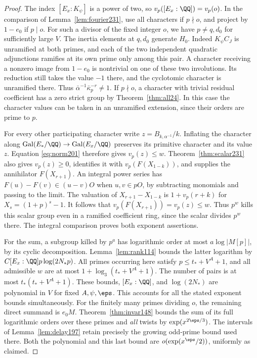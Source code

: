 \documentclass[a4paper,11pt]{article}
\theoremstyle{definition}
\theoremstyle{remark}
\numberwithin{equation}{section}
\begin{document}
\begin{proof}
The index \([E_x:K_\psi]\) is a power of two, so \(v_p([E_x:\QQ])=
v_p(o)\). In the comparison of Lemma~\ref{lem:fourier231},
use all characters if \(p\nmid o\), and project by \(1-e_0\)
if \(p\mid o\). For such a divisor of the fixed integer \(o\),
we have \(p\ne q,d_0\) for sufficiently large \(V\).
The inertia elements at \(q,d_0\) generate \(H_0\).
Indeed \(K_\psi C_J\) is unramified at both primes, and each
of the two independent quadratic adjunctions ramifies at its
own prime only among this pair. A character receiving a nonzero
image from \(1-e_0\) is nontrivial on one of these two involutions.
Its reduction still takes the value \(-1\) there, and the
cyclotomic character is unramified there. Thus
\(\bar\alpha^{-1}\bar\kappa_p^{-r}\ne1\).
If \(p\nmid o\), a character with trivial residual coefficient
has a zero strict group by Theorem~\ref{thm:all24}.
In this case the character values can be taken in an unramified
extension, since their orders are prime to \(p\).

For every other participating character write \(z=B_{k,\alpha^{-1}}/k\).
Inflating the character along \(\operatorname{Gal}(E_*/\QQ)\to
\operatorname{Gal}(E_x/\QQ)\) preserves its primitive character
and its value \(z\). Equation \eqref{eq:norm201} therefore gives
\(v_p(z)\le w\). Theorem~\ref{thm:scalar231}
also gives \(v_p(z)\ge0\), identifies it with \(v_p(F(X_{1-k}))\),
and supplies the annihilator \(F(X_{r+1})\).
An integral power series has
\(F(u)-F(v)\in(u-v)O\) when \(u,v\in pO\), by subtracting
monomials and passing to the limit. The valuation of
\(X_{r+1}-X_{1-k}\) is \(1+v_p(r+k)\) for \(X_s=(1+p)^s-1\).
It follows that \(v_p(F(X_{r+1}))=v_p(z)\le w\).
Thus \(p^w\) kills this scalar group even in a ramified coefficient
ring, since the scalar divides \(p^w\) there. The integral
comparison proves both exponent assertions.

For the sum, a subgroup killed by \(p^a\) has logarithmic order
at most \(a\log|M[p]|\), by its cyclic decomposition.
Lemma~\ref{lem:rank114} bounds the latter logarithm by
\(C[E_x:\QQ]p\log(2N_*p)\). All primes occurring here satisfy
\(p\le t_*+V^A+1\), and all admissible \(w\) are at most
\(1+\log_3(t_*+V^A+1)\). The number of pairs is at most
\(t_*(t_*+V^A+1)\). These bounds, \([E_x:\QQ]\), and
\(\log(2N_*)\) are polynomial in \(V\) for fixed \(A,\psi,\eps\).
This accounts for all the stated exponent bounds simultaneously.
For the finitely many primes dividing \(o\), the remaining direct
summand is \(e_0M\). Theorem~\ref{thm:invar148} bounds the sum of
its full logarithmic orders over these primes and \emph{all} twists
by \(\exp(x^{2\eps/3})\). The intervals of Lemma~\ref{lem:delay197}
retain precisely the growing odd-prime bound used there.
Both the polynomial and this last bound are
\(o(\exp(x^\eps/2))\), uniformly as claimed.
\end{proof}
\end{document}

